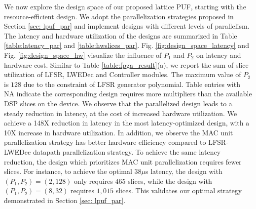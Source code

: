 We now explore the design space of our proposed lattice PUF, starting with the resource-efficient design. We adopt the parallelization strategies proposed in Section \ref{sec: lpuf_par} and implement designs with different levels of parallelism. The latency and hardware utilization of the designs are summarized in Table \ref{table:latency_par} and \ref{table:hwslices_par}. Fig. \ref{fig:design_space_latency} and Fig. \ref{fig:design_space_hw} visualize the influence of $P_1$ and $P_2$ on latency and hardware cost. Similar to Table %
\ref{table:fpga_result}(a), we report the sum of slice utilization of LFSR, LWEDec and Controller modules. The maximum value of $P_2$ is $128$ due to the constraint of LFSR generator polynomial. Table entries with NA indicate the corresponding design requires more multipliers than the available DSP slices on the device. We observe that the parallelized design leads to a steady reduction in latency, at the cost of increased hardware utilization. We achieve a 148X reduction in latency in the most latency-optimized design, with a 10X increase in hardware utilization. %
In addition, we observe the MAC unit parallelization strategy has better hardware efficiency compared to LFSR-LWEDec datapath parallelization strategy. To achieve the same latency reduction, the design which prioritizes MAC unit parallelization requires fewer slices. For instance, to achieve the optimal $38 \mu$s latency, the design with $(P_1, P_2) = (2, 128)$ only requires $465$ slices, while the design with $(P_1, P_2) = (8, 32)$ requires $1,015$ slices. This validates our optimal strategy demonstrated in Section \ref{sec: lpuf_par}. %

